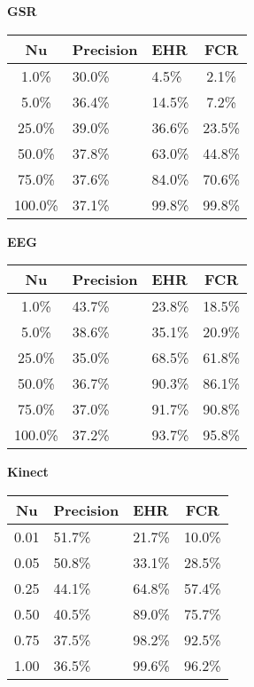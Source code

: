 \begin{table}[h]
  \centering
  \textbf{GSR}\vspace{2pt}
  \begin{tabularx}{\columnwidth}{cXXc}
    \toprule
    \textbf{Nu} & \textbf{Precision} & \textbf{EHR} & \textbf{FCR} \\
    \midrule
    1.0\% & 30.0\% & 4.5\% & 2.1\% \\ \hline
    5.0\% & 36.4\% & 14.5\% & 7.2\% \\ \hline
    25.0\% & 39.0\% & 36.6\% & 23.5\% \\ \hline
    50.0\% & 37.8\% & 63.0\% & 44.8\% \\ \hline
    75.0\% & 37.6\% & 84.0\% & 70.6\% \\ \hline
    100.0\% & 37.1\% & 99.8\% & 99.8\% \\ \hline
    \bottomrule
  \end{tabularx}

  \vspace{4pt}

  \textbf{EEG}\vspace{2pt}
  \begin{tabularx}{\columnwidth}{cXXc}
    \toprule
    \textbf{Nu} & \textbf{Precision} & \textbf{EHR} & \textbf{FCR} \\
    \midrule
    1.0\% & 43.7\% & 23.8\% & 18.5\% \\ \hline
    5.0\% & 38.6\% & 35.1\% & 20.9\% \\ \hline
    25.0\% & 35.0\% & 68.5\% & 61.8\% \\ \hline
    50.0\% & 36.7\% & 90.3\% & 86.1\% \\ \hline
    75.0\% & 37.0\% & 91.7\% & 90.8\% \\ \hline
    100.0\% & 37.2\% & 93.7\% & 95.8\% \\ \hline
    \bottomrule
  \end{tabularx}

  \vspace{4pt}

  \textbf{Kinect}\vspace{2pt}
  \begin{tabularx}{\columnwidth}{cXXc}
    \toprule
    \textbf{Nu} & \textbf{Precision} & \textbf{EHR} & \textbf{FCR} \\
    \midrule
    0.01 & 51.7\% & 21.7\% & 10.0\% \\ \hline
    0.05 & 50.8\% & 33.1\% & 28.5\% \\ \hline
    0.25 & 44.1\% & 64.8\% & 57.4\% \\ \hline
    0.50 & 40.5\% & 89.0\% & 75.7\% \\ \hline
    0.75 & 37.5\% & 98.2\% & 92.5\% \\ \hline
    1.00 & 36.5\% & 99.6\% & 96.2\% \\ \hline
    \bottomrule
  \end{tabularx}


\end{table}

